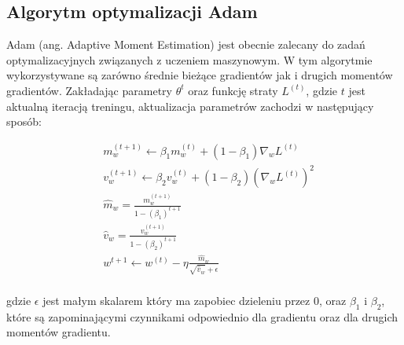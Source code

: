 \newpage
\subsection{Algorytm optymalizacji Adam}
Adam (ang. Adaptive Moment Estimation) jest obecnie zalecany do zadań optymalizacyjnych związanych z uczeniem maszynowym.
W tym algorytmie wykorzystywane są zarówno średnie bieżące gradientów jak i drugich momentów gradientów.
Zakładając parametry $\theta^{t}$ oraz funkcję straty $L^{(t)}$, gdzie $t$ jest aktualną iteracją treningu, 
aktualizacja parametrów zachodzi w następujący sposób:

\begin{align*}
  &m_w^{(t+1)} \leftarrow \beta_{1}m_w^{(t)} + (1 - \beta_1)\nabla_wL^{(t)} \\
  &v_w^{(t+1)} \leftarrow \beta_{2}v_w^{(t)} + (1 - \beta_2)(\nabla_wL^{(t)})^2 \\
  &\hat m_w = \frac{m_w^{(t+1)}}{1 - (\beta_1)^{t+1}} \\
  &\hat v_w = \frac{v_w^{(t+1)}}{1 - (\beta_2)^{t+1}} \\
  &w^{t+1} \leftarrow w^{(t)} -  \eta \frac{\hat m_w}{\sqrt{\hat v_w} + \epsilon} \\
\end{align*}

gdzie $\epsilon$ jest małym skalarem który ma zapobiec dzieleniu przez $0$, 
oraz $\beta _{1}$ i $\beta_{2}$, które są zapominającymi czynnikami odpowiednio dla gradientu oraz dla 
drugich momentów gradientu.
